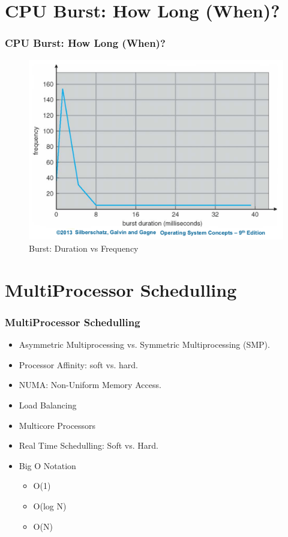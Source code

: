 \documentclass[aspectratio=169, xcolor=table, notheorems, hyperref={pdfpagelabels=false}]{beamer}
\begin{document}
\section{CPU Burst: How Long (When)?}
\begin{frame}
\frametitle{CPU Burst: How Long (When)?}
\begin{figure}
\includegraphics[width=0.60\linewidth]{os08-osc9}
\caption{Burst: Duration vs Frequency}
\end{figure}
\end{frame}

\section{MultiProcessor Schedulling}
\begin{frame}
\frametitle{MultiProcessor Schedulling}
\begin{itemize}
\item Asymmetric Multiprocessing vs. Symmetric Multiprocessing (SMP).
\item Processor Affinity: soft vs. hard.
\item NUMA: Non-Uniform Memory Access.
\item Load Balancing
\item Multicore Processors
\item Real Time Schedulling: Soft vs. Hard.
\item Big O Notation
\begin{itemize}
\item O(1)
\item O(log N)
\item O(N)
\end{itemize}
\end{itemize}
\end{frame}

\end{document}
